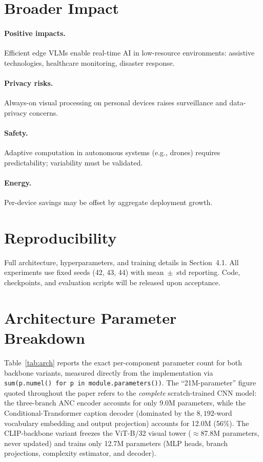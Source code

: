 \documentclass{article}
\begin{document}

\appendix

\section{Broader Impact}

\paragraph{Positive impacts.}
Efficient edge VLMs enable real-time AI in low-resource environments: assistive technologies, healthcare monitoring, disaster response.

\paragraph{Privacy risks.}
Always-on visual processing on personal devices raises surveillance and data-privacy concerns.

\paragraph{Safety.}
Adaptive computation in autonomous systems (e.g., drones) requires predictability; variability must be validated.

\paragraph{Energy.}
Per-device savings may be offset by aggregate deployment growth.

\section{Reproducibility}

Full architecture, hyperparameters, and training details in Section~4.1. All experiments use fixed seeds (42, 43, 44) with mean~$\pm$~std reporting. Code, checkpoints, and evaluation scripts will be released upon acceptance.

\section{Architecture Parameter Breakdown}
\label{app:arch}

Table~\ref{tab:arch} reports the exact per-component parameter count for both backbone variants, measured directly from the implementation via \texttt{sum(p.numel() for p in module.parameters())}. The ``21M-parameter'' figure quoted throughout the paper refers to the \emph{complete} scratch-trained CNN model: the three-branch ANC encoder accounts for only 9.0M parameters, while the Conditional-Transformer caption decoder (dominated by the $8{,}192$-word vocabulary embedding and output projection) accounts for 12.0M (56\%). The CLIP-backbone variant freezes the ViT-B/32 visual tower ($\approx$87.8M parameters, never updated) and trains only 12.7M parameters (MLP heads, branch projections, complexity estimator, and decoder).
\end{document}
